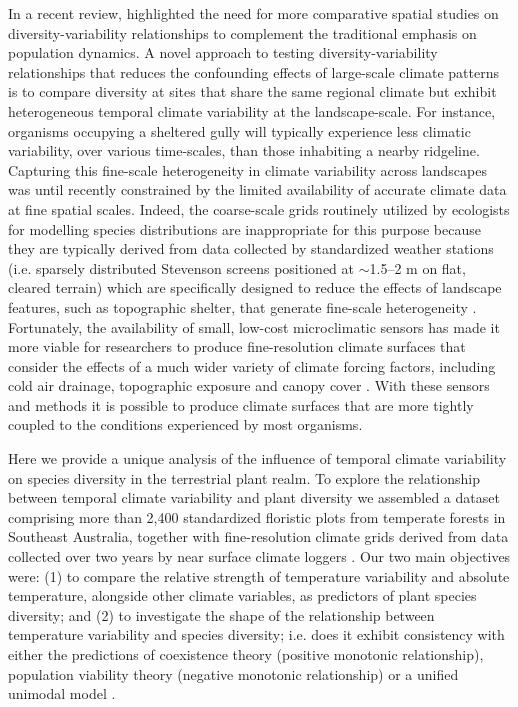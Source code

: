 In a recent review, \citet{White2010} highlighted the need for more comparative spatial studies on diversity-variability relationships to complement the traditional emphasis on population dynamics. A novel approach to testing diversity-variability relationships that reduces the confounding effects of large-scale climate patterns is to compare diversity at sites that share the same regional climate but exhibit heterogeneous temporal climate variability at the landscape-scale. For instance, organisms occupying a sheltered gully will typically experience less climatic variability, over various time-scales, than those inhabiting a nearby ridgeline. Capturing this fine-scale heterogeneity in climate variability across landscapes was until recently constrained by the limited availability of accurate climate data at fine spatial scales. Indeed, the coarse-scale grids routinely utilized by ecologists for modelling species distributions are inappropriate for this purpose because they are typically derived from data collected by standardized weather stations (i.e. sparsely distributed Stevenson screens positioned at ${\sim}$1.5--2 m on flat, cleared terrain) which are specifically designed to reduce the effects of landscape features, such as topographic shelter, that generate fine-scale heterogeneity \citep{Ashcroft2012b}. Fortunately, the availability of small, low-cost microclimatic sensors has made it more viable for researchers to produce fine-resolution climate surfaces that consider the effects of a much wider variety of climate forcing factors, including cold air drainage, topographic exposure and canopy cover \citep{Ashcroft2011, Ashcroft2012b}. With these sensors and methods it is possible to produce climate surfaces that are more tightly coupled to the conditions experienced by most organisms. 


Here we provide a unique analysis of the influence of temporal climate variability on species diversity in the terrestrial plant realm. To explore the relationship between temporal climate variability and plant diversity we assembled a dataset comprising more than 2,400 standardized floristic plots from temperate forests in Southeast Australia, together with fine-resolution climate grids derived from data collected over two years by near surface climate loggers \citep[see][]{Ashcroft2012b}. Our two main objectives were: (1) to compare the relative strength of temperature variability and absolute temperature, alongside other climate variables, as predictors of plant species diversity; and (2) to investigate the shape of the relationship between temperature variability and species diversity; i.e. does it exhibit consistency with either the predictions of coexistence theory (positive monotonic relationship), population viability theory (negative monotonic relationship) or a unified unimodal model \citep[\textit{sensu}][]{Adler2006}.

